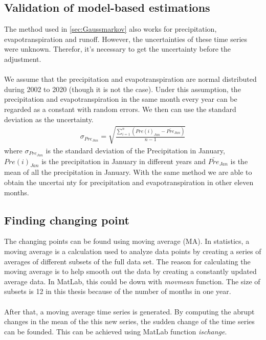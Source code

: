 \subsection{Validation of model-based estimations}\label{sec:error}
The method used in \autoref{sec:Gaussmarkov} also works for precipitation, evapotranspiration and runoff. However, the uncertainties of these time series were unknown. Therefor, it's necessary to get the uncertainty before the adjustment. \\\\
We assume that the precipitation and evapotranspiration are normal distributed during 2002 to 2020 (though it is not the case). Under this assumption, the precipitation and evapotranspiration in the same month every year can be regarded as a constant with random errors. We then can use the standard deviation as the uncertainty.
\begin{gather}
\sigma_{Pre_{Jan}} = \sqrt{\frac{\sum_{i=1}^{n} (Pre(i)_{Jan} - \bar{Pre}_{Jan})}{n-1}}
\end{gather}
where $\sigma_{Pre_{Jan}}$ is the standard deviation of the Precipitation in January, $Pre(i)_{Jan}$ is the precipitation in January in different years and $\bar{Pre}_{Jan}$ is the mean of all the precipitation in January. With the same method we are able to obtain the uncertai nty for precipitation and evapotranspiration in other eleven months. 
\subsection{Finding changing point}\label{sec:changpoint}
The changing points can be found using moving average (MA). In statistics, a moving average is a calculation used to analyze data points by creating a series of averages of different subsets of the full data set. The reason for calculating the moving average is to help smooth out the data by creating a constantly updated average data. In MatLab, this could be down with \textit{movmean} function. The size of subsets is 12 in this thesis because of the number of months in one year.\\\\
After that, a moving average time series is generated. By computing the abrupt changes in the mean of the this new series, the sudden change of the time series can be founded. This can be achieved using MatLab function \textit{ischange}. 
